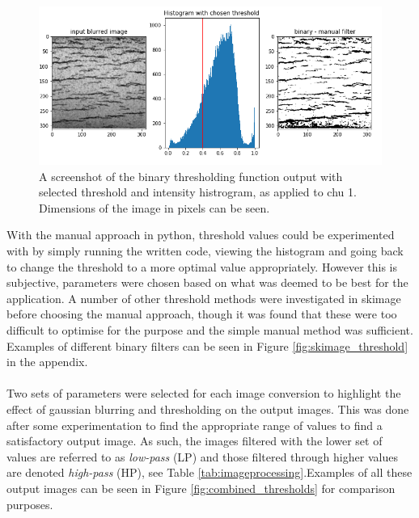 \documentclass{article}
\begin{document}
	\begin{figure}[h]
	    \centering
	    \includegraphics[scale=0.5]{Figures/chu1_skbinary.png}
	    \caption{A screenshot of the binary thresholding function output with selected threshold and intensity histrogram, as applied to chu 1. Dimensions of the image in pixels can be seen.}
	    \label{skbinary}
	\end{figure}
	
	With the manual approach in python, threshold values could be experimented with by simply running the written code, viewing the histogram and going back to change the threshold to a more optimal value appropriately. However this is subjective, parameters were chosen based on what was deemed to be best for the application. A number of other threshold methods were investigated in skimage before choosing the manual approach, though it was found that these were too difficult to optimise for the purpose and the simple manual method was sufficient. Examples of different binary filters can be seen in Figure \ref{fig:skimage_threshold} in the appendix.
	\\
	\\
	Two sets of parameters were selected for each image conversion to highlight the effect of gaussian blurring and thresholding on the output images. This was done after some experimentation to find the appropriate range of values to find a satisfactory output image. As such, the images filtered with the lower set of values are referred to as \textit{low-pass} (LP) and those filtered through higher values are denoted \textit{high-pass} (HP), see Table \ref{tab:imageprocessing}.Examples of all these output images can be seen in Figure \ref{fig:combined_thresholds} for comparison purposes.
	
\end{document}

